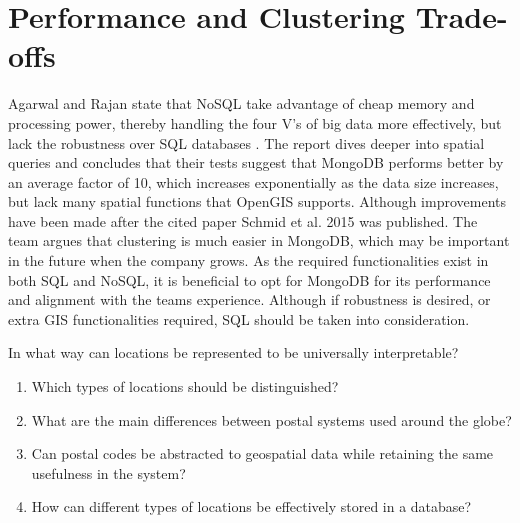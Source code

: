 \section{Performance and Clustering Trade-offs}
Agarwal and Rajan state that NoSQL take advantage of cheap memory and processing power, thereby handling the four V’s of big data more effectively,
but lack the robustness over SQL databases . The report dives deeper into spatial queries and concludes that their tests suggest that MongoDB performs better by an average factor of 10, which increases exponentially as the data size increases, but lack many spatial functions that OpenGIS supports. Although improvements have been made  after the cited paper Schmid et al. 2015  was published. The team argues that clustering is much easier in MongoDB, which may be important in the future when the company grows. As the required functionalities exist in both SQL and NoSQL, it is beneficial to opt for MongoDB for its performance and alignment with the teams experience. Although if robustness is desired, or extra GIS functionalities required, SQL should be taken into consideration.


In what way can locations be represented to be universally interpretable?
\begin{enumerate}
	\item Which types of locations should be distinguished?
	\item What are the main differences between postal systems used around the globe?
	\item Can postal codes be abstracted to geospatial data while retaining the same usefulness in the system?
	\item How can different types of locations be effectively stored in a database?
\end{enumerate}
